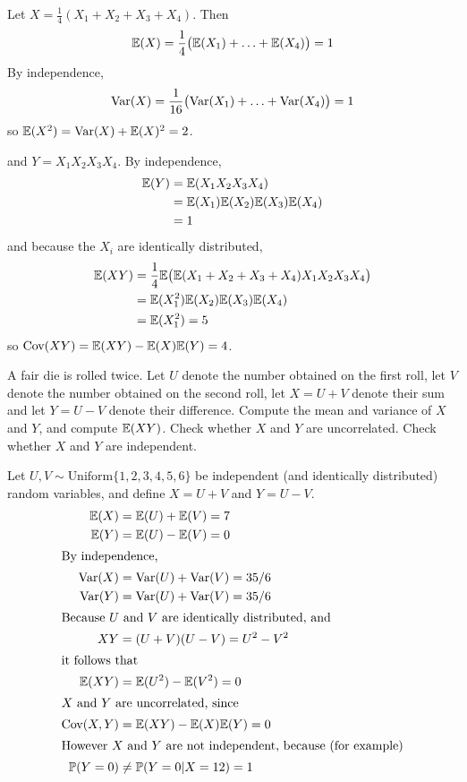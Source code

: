 \begin{exercise}
\begin{questions}
\begin{answer}
Let $X=\frac{1}{4}(X_1+X_2+X_3+X_4)$. Then
\[
\mathbb{E}(X) 	= \frac{1}{4}\big(\mathbb{E}(X_1)+\ldots+\mathbb{E}(X_4)\big) = 1
\]
By independence,
\[
\text{Var}(X) 	= \frac{1}{16}\big(\text{Var}(X_1)+\ldots+\text{Var}(X_4)\big) = 1 
\]
so $\mathbb{E}(X^2)	= \text{Var}(X) + \mathbb{E}(X)^2 = 2$.

and $Y=X_1 X_2 X_3 X_4$. By independence,
\begin{align*}
\mathbb{E}(Y) 
	& = \mathbb{E}(X_1 X_2 X_3 X_4) \\
	& = \mathbb{E}(X_1)\mathbb{E}(X_2)\mathbb{E}(X_3)\mathbb{E}(X_4) \\
	& = 1 \\
\end{align*}
and because the $X_i$ are identically distributed,
\begin{align*}
\mathbb{E}(XY) 
	& = \frac{1}{4}\mathbb{E}\big(\mathbb{E}(X_1+X_2+X_3+X_4)X_1X_2X_3X_4\big) \\
	& = \mathbb{E}(X_1^2)\mathbb{E}(X_2)\mathbb{E}(X_3)\mathbb{E}(X_4) \\
	& = \mathbb{E}(X_1^2) = 5 \\
\end{align*}
so $\text{Cov}(XY) = \mathbb{E}(XY) - \mathbb{E}(X)\mathbb{E}(Y) = 4$.
\end{answer} 

\question
A fair die is rolled twice. Let $U$ denote the number obtained on the first roll, let $V$ denote the number obtained on the second roll, let $X=U+V$ denote their sum and let $Y=U-V$ denote their difference. Compute the mean and variance of $X$ and $Y$, and compute $\mathbb{E}(XY)$. Check whether $X$ and $Y$ are uncorrelated. Check whether $X$ and $Y$ are independent.
\begin{answer}
Let $U,V\sim\text{Uniform}\{1,2,3,4,5,6\}$ be independent (and identically distributed) random variables, and define $X=U+V$ and $Y=U-V$. 
\begin{align*}
\mathbb{E}(X)	& = \mathbb{E}(U) + \mathbb{E}(V) = 7 \\
\mathbb{E}(Y)	& = \mathbb{E}(U) - \mathbb{E}(V) = 0 \\
\intertext{By independence,}
\text{Var}(X)		& = \text{Var}(U) + \text{Var}(V) = 35/6 \\
\text{Var}(Y)		& = \text{Var}(U) + \text{Var}(V) = 35/6 \\
\intertext{Because $U$ and $V$ are identically distributed, and}
XY 			& = (U+V)(U-V) = U^2 - V^2 \\
\intertext{it follows that}
\mathbb{E}(XY)	& = \mathbb{E}(U^2) - \mathbb{E}(V^2) = 0 \\
\intertext{$X$ and $Y$ are uncorrelated, since}
\text{Cov}(X,Y)	& = \mathbb{E}(XY) - \mathbb{E}(X)\mathbb{E}(Y) =0 \\
\intertext{However $X$ and $Y$ are not independent, because (for example)}
\mathbb{P}(Y=0)		& \neq \mathbb{P}(Y=0|X=12)=1
\end{align*}
\end{answer} 

\end{questions}
\end{exercise}
